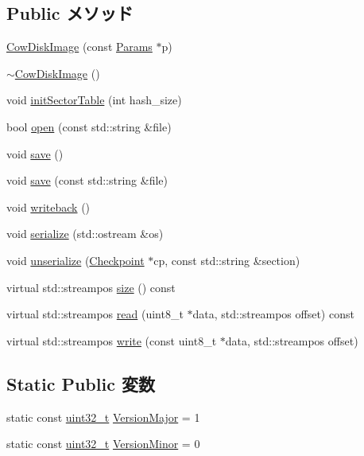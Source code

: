 \subsection*{Public メソッド}
\begin{DoxyCompactItemize}
\item 
\hyperlink{classCowDiskImage_ad27dd208186bea9d387d4f83cf605679}{CowDiskImage} (const \hyperlink{classCowDiskImage_a564df726143da4914743e9d8c1a17c6c}{Params} $\ast$p)
\item 
\hyperlink{classCowDiskImage_a95d88dc63c0c2dd7c28f255cfbe2e8f5}{$\sim$CowDiskImage} ()
\item 
void \hyperlink{classCowDiskImage_a68d4538305e2037525db5bdbb9e8881e}{initSectorTable} (int hash\_\-size)
\item 
bool \hyperlink{classCowDiskImage_a5acc5a46099815559b3081f2fa5c3464}{open} (const std::string \&file)
\item 
void \hyperlink{classCowDiskImage_aae2c382151ef7c9aa913361172b30db6}{save} ()
\item 
void \hyperlink{classCowDiskImage_a7b34aadc98977c91db5b87747f7e7ea9}{save} (const std::string \&file)
\item 
void \hyperlink{classCowDiskImage_a9e578fb7567063e3ea37096c827e0412}{writeback} ()
\item 
void \hyperlink{classCowDiskImage_a53e036786d17361be4c7320d39c99b84}{serialize} (std::ostream \&os)
\item 
void \hyperlink{classCowDiskImage_af22e5d6d660b97db37003ac61ac4ee49}{unserialize} (\hyperlink{classCheckpoint}{Checkpoint} $\ast$cp, const std::string \&section)
\item 
virtual std::streampos \hyperlink{classCowDiskImage_ac47c8c9bb5ae5fbfa7e05b464d3e20d4}{size} () const 
\item 
virtual std::streampos \hyperlink{classCowDiskImage_ab2e0b5adfb9d2c78b1e534efa2af6e45}{read} (uint8\_\-t $\ast$data, std::streampos offset) const 
\item 
virtual std::streampos \hyperlink{classCowDiskImage_aadff68e91a6ca912a1878d79af3d0692}{write} (const uint8\_\-t $\ast$data, std::streampos offset)
\end{DoxyCompactItemize}
\subsection*{Static Public 変数}
\begin{DoxyCompactItemize}
\item 
static const \hyperlink{Type_8hh_a435d1572bf3f880d55459d9805097f62}{uint32\_\-t} \hyperlink{classCowDiskImage_aea9111b09377b8ceea1a83f731859e94}{VersionMajor} = 1
\item 
static const \hyperlink{Type_8hh_a435d1572bf3f880d55459d9805097f62}{uint32\_\-t} \hyperlink{classCowDiskImage_ab69a15e46e9c6523e2b08bcff16b3013}{VersionMinor} = 0
\end{DoxyCompactItemize}
